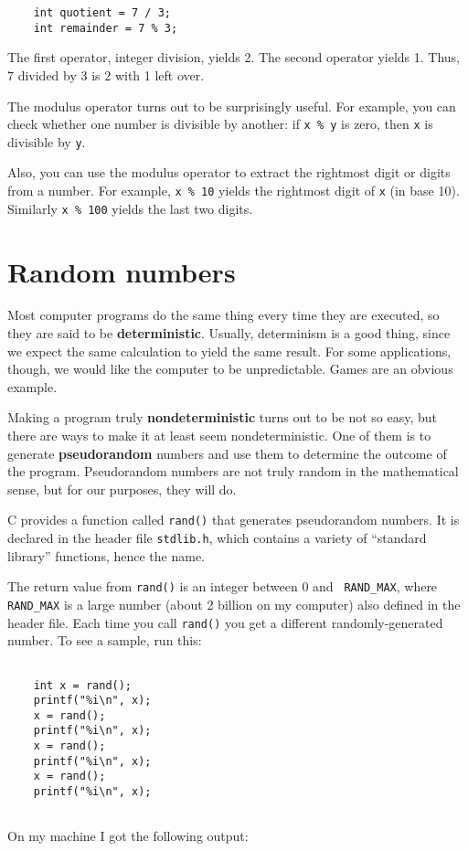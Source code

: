 \begin{verbatim}
    int quotient = 7 / 3;
    int remainder = 7 % 3;
\end{verbatim}
%
The first operator, integer division, yields 2.  The second
operator yields 1.  Thus, 7 divided by 3 is 2 with 1 left over.

The modulus operator turns out to be surprisingly useful.  For
example, you can check whether one number is divisible by
another: if {\tt x \% y} is zero, then {\tt x} is divisible
by {\tt y}.

Also, you can use the modulus operator to extract the rightmost
digit or digits from a number.  For example, {\tt x \% 10} yields
the rightmost digit of {\tt x} (in base 10).  Similarly
{\tt x \% 100} yields the last two digits.


\section{Random numbers}
\label{Random numbers}
\label{random}
\label{pseudorandom}
Most computer programs do the same thing every time they are executed,
so they are said to be {\bf deterministic}.  Usually, determinism is a
good thing, since we expect the same calculation to yield the same
result.  For some applications, though, we would like the
computer to be unpredictable.  Games are an obvious example.

Making a program truly {\bf nondeterministic} turns out to be not
so easy, but there are ways to make it at least seem
nondeterministic.  One of them is to generate {\bf pseudorandom} numbers and
use them to determine the outcome of the program.
Pseudorandom numbers
are not truly random in the mathematical sense, but 
for our purposes, they will do.


C provides a function called {\tt rand()} that generates
pseudorandom numbers.  It is declared in the
header file {\tt stdlib.h}, which contains a variety of ``standard
library'' functions, hence the name.

The return value from {\tt rand()} is an integer between 0 and {\tt
	RAND\_MAX}, where {\tt RAND\_MAX} is a large number (about 2 billion
on my computer) also defined in the header file.  Each time you call
{\tt rand()} you get a different randomly-generated number.  To see a
sample, run this:

\begin{verbatim}

    int x = rand();
    printf("%i\n", x);
    x = rand();
    printf("%i\n", x);
    x = rand();
    printf("%i\n", x);
    x = rand();
    printf("%i\n", x);
    
\end{verbatim}
%
On my machine I got the following output:

